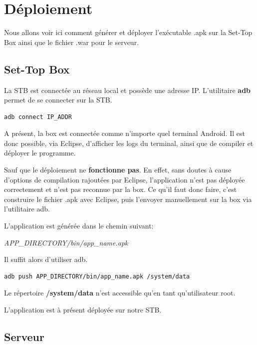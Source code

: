 
\section{Déploiement}

Nous allons voir ici comment générer et déployer l'exécutable .apk sur la Set-Top Box ainsi que le fichier .war pour le serveur.

\subsection{Set-Top Box}
La STB est connectée au réseau local et possède une adresse IP. L'utilitaire \textbf{adb} permet de se connecter sur la STB.
\begin{lstlisting}[caption={Connection à la Set-Top Box via ADB}]
adb connect IP_ADDR
\end{lstlisting}

A présent, la box est connectée comme n'importe quel terminal Android. Il est donc possible, via Eclipse, d'afficher les logs du terminal, ainsi que de compiler et déployer le programme.

\medskip

Sauf que le déploiement ne \textbf{fonctionne pas}. En effet, sans doutes à cause d'options de compilation rajoutées par Eclipse, l'application n'est pas déployée correctement et n'est pas reconnue par la box. Ce qu'il faut donc faire, c'est construire le fichier .apk avec Eclipse, puis l'envoyer manuellement sur la box via l'utilitaire adb.

\medskip

L'application est générée dans le chemin suivant:

\textit{APP\_DIRECTORY/bin/app\_name.apk}

\medskip

Il suffit alors d'utiliser adb.

\begin{lstlisting}[caption={Envoi du fichier apk sur la Set-Top Box}]
adb push APP_DIRECTORY/bin/app_name.apk /system/data
\end{lstlisting}

Le répertoire \textbf{/system/data} n'est accessible qu'en tant qu'utilisateur root.

\medskip

L'application est à présent déployée sur notre STB.
\subsection{Serveur}

